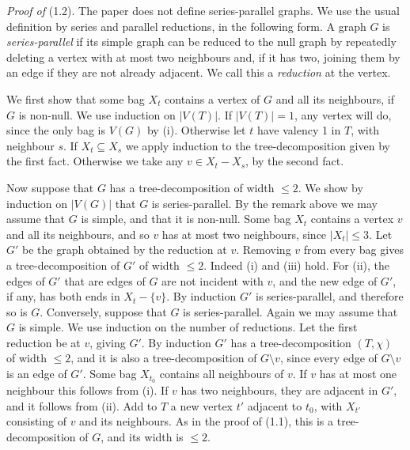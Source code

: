 {\textit{Proof of} (1.2). The paper does not define series-parallel graphs. We use the usual
definition by series and parallel reductions, in the following form. A graph $G$ is
\textit{series-parallel} if its simple graph can be reduced to the null graph by repeatedly deleting a vertex
with at most two neighbours and, if it has two, joining them by an edge if they are not already
adjacent. We call this a \textit{reduction} at the vertex.

We first show that some bag $X_t$ contains a vertex of $G$ and all its neighbours, if $G$ is
non-null. We use induction on $|V(T)|$. If $|V(T)| = 1$, any vertex will do, since the only bag is $V(G)$ by (i).
Otherwise let $t$ have valency 1 in $T$, with neighbour $s$. If $X_t \subseteq X_s$ we apply
induction to the tree-decomposition given by the first fact. Otherwise we take any
$v \in X_t - X_s$, by the second fact.

Now suppose that $G$ has a tree-decomposition of width $\le 2$. We show by induction on $|V(G)|$
that $G$ is series-parallel. By the remark above we may assume that $G$ is simple, and that it is
non-null. Some bag $X_t$ contains a vertex
$v$ and all its neighbours, and so $v$ has at most two neighbours, since $|X_t| \le 3$. Let $G'$ be
the graph obtained by the reduction at $v$. Removing $v$ from every bag gives a tree-decomposition
of $G'$ of width $\le 2$. Indeed (i) and (iii) hold. For (ii), the edges of $G'$ that are edges of $G$
are not incident with $v$, and the new edge of $G'$, if any, has both ends in $X_t - \{v\}$. By induction $G'$ is series-parallel, and therefore so is $G$. Conversely,
suppose that $G$ is series-parallel. Again we may assume that $G$ is simple. We use induction on the number of reductions. Let the first
reduction be at $v$, giving $G'$. By induction $G'$ has a tree-decomposition $(T, \chi)$ of width
$\le 2$, and it is also a tree-decomposition of $G \setminus v$, since every edge of
$G \setminus v$ is an edge of $G'$. Some bag $X_{t_0}$ contains all neighbours of $v$. If $v$ has
at most one neighbour this follows from (i). If $v$ has two neighbours, they are adjacent in $G'$,
and it follows from (ii). Add to $T$ a new vertex $t'$ adjacent to $t_0$, with $X_{t'}$ consisting
of $v$ and its neighbours. As in the proof of (1.1), this is a tree-decomposition of $G$, and its
width is $\le 2$.

}
